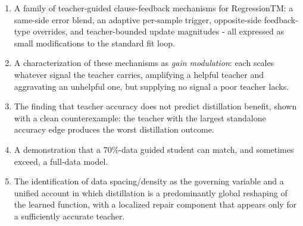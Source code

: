 \begin{enumerate}
  \item A family of teacher-guided clause-feedback mechanisms for RegressionTM: a
    same-side error blend, an adaptive per-sample trigger, opposite-side feedback-type
    overrides, and teacher-bounded update magnitudes - all expressed as small
    modifications to the standard fit loop.
  \item A characterization of these mechanisms as \textit{gain modulation}: each scales
    whatever signal the teacher carries, amplifying a helpful teacher and aggravating an
    unhelpful one, but supplying no signal a poor teacher lacks.
  \item The finding that teacher accuracy does not predict distillation benefit, shown with a
    clean counterexample: the teacher with the largest standalone accuracy edge produces
    the worst distillation outcome.
  \item A demonstration that a 70\%-data guided student can match, and sometimes exceed, a
    full-data model.
  \item The identification of data spacing/density as the governing variable and a
    unified account in which distillation is a predominantly global reshaping of the
    learned function, with a localized repair component that appears only for a
    sufficiently accurate teacher.
\end{enumerate}
